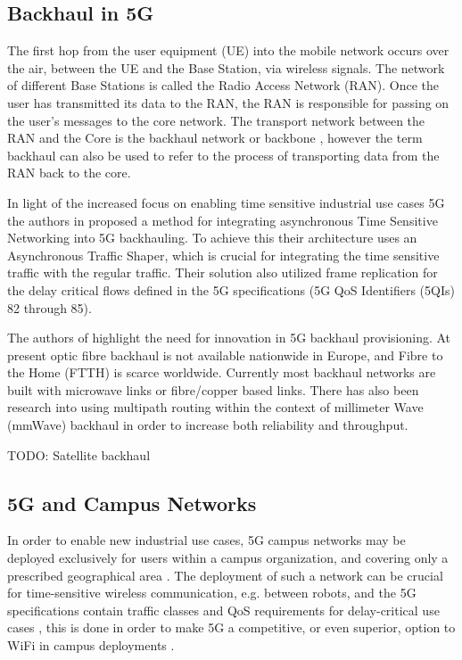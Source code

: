\subsection{Backhaul in 5G}

The first hop from the user equipment (UE) into the mobile network occurs over the air, between the UE and the Base Station, via wireless signals. The network of different Base Stations is called the Radio Access Network (RAN). Once the user has transmitted its data to the RAN, the RAN is responsible for passing on the user's messages to the core network. The transport network between the RAN and the Core is the backhaul network or backbone \cite{jaber20165g}, however the term backhaul can also be used to refer to the process of transporting data from the RAN back to the core.

In light of the increased focus on enabling time sensitive industrial use cases 5G the authors in \cite{prados2021asynchronous} proposed a method for integrating asynchronous Time Sensitive Networking into 5G backhauling. To achieve this their architecture uses an Asynchronous Traffic Shaper, which is crucial for integrating the time sensitive traffic with the regular traffic. Their solution also utilized frame replication for the delay critical flows defined in the 5G specifications (5G QoS Identifiers (5QIs) 82 through 85).

The authors of \cite{jaber20165g} highlight the need for innovation in 5G backhaul provisioning. At present optic fibre backhaul is not available nationwide in Europe, and Fibre to the Home (FTTH) is scarce worldwide. Currently most backhaul networks are built with microwave links or fibre/copper based links. There has also been research \cite{seppanen2016multipath, saadat2018multipath} into using multipath routing within the context of millimeter Wave (mmWave) backhaul in order to increase both reliability and throughput.

TODO: Satellite backhaul

\subsection{5G and Campus Networks}

In order to enable new industrial use cases, 5G campus networks may be deployed exclusively for users within a campus organization, and covering only a prescribed geographical area \cite{rischke20215g}. The deployment of such a network can be crucial for time-sensitive wireless communication, e.g. between robots, and the 5G specifications contain traffic classes and QoS requirements for delay-critical use cases \cite{3gpp.23.501}, this is done in order to make 5G a competitive, or even superior, option to WiFi in campus deployments \cite{walia20175g}.

